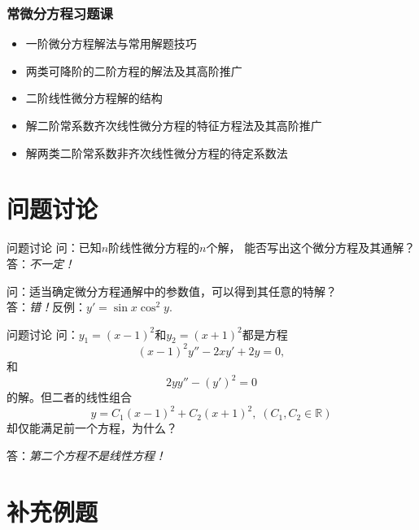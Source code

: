 
\begin{frame}
	\frametitle{常微分方程习题课}
	\linespread{1.5}
	  \begin{itemize}
	    \item 一阶微分方程解法与常用解题技巧
	    \item 两类可降阶的二阶方程的解法及其高阶推广
	    \item 二阶线性微分方程解的结构
	    \item 解二阶常系数齐次线性微分方程的特征方程法及其高阶推广
	    \item 解两类二阶常系数非齐次线性微分方程的待定系数法
	  \end{itemize}
\end{frame}

\section{问题讨论}

\begin{frame}{问题讨论}
	\linespread{1.5}
	\alert{问：}已知$n$阶线性微分方程的$n$个解，
	能否写出这个微分方程及其通解？\pause\\[1ex]
	
	\alert{答：}{\it 不一定！} \pause 
	
	\bigskip
	\alert{问：}适当确定微分方程通解中的参数值，可以得到其任意的特解？\pause \\[1ex]
	
	\alert{答：}{\it 错！}\pause 反例：{\it $y'=\sin x\cos^2y$}.
\end{frame}

\begin{frame}{问题讨论}
	\linespread{1.2}
	\alert{问：}$y_1=(x-1)^2$和$y_2=(x+1)^2$都是方程
	$$(x-1)^2y''-2xy'+2y=0,$$
	和
	$$2yy''-(y')^2=0$$
	的解。但二者的线性组合
	$$y=C_1(x-1)^2+C_2(x+1)^2,\;(C_1,C_2\in\mathbb{R})$$
	却仅能满足前一个方程，为什么？\pause 
	
	\alert{答：}{\it 第二个方程不是线性方程！}
\end{frame}

\section{补充例题}

